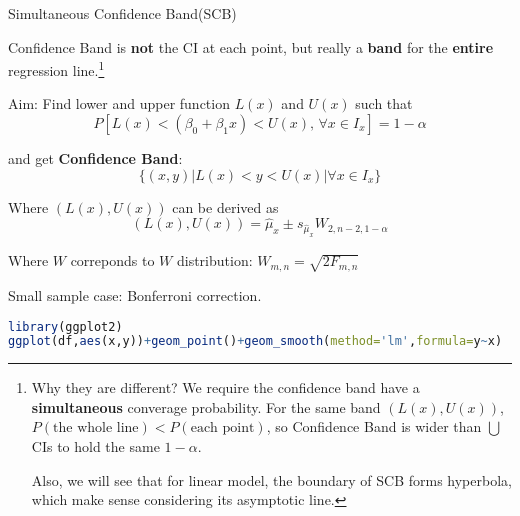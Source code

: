     


    \begin{point}
       Simultaneous Confidence Band(SCB)
    \end{point}

    Confidence Band is \textbf{not} the CI at each point, but really a \textbf{band} for the \textbf{entire} regression line.\footnote{Why they are different? We require the confidence band have a \textbf{simultaneous} converage probability. For the same band $ (L(x),U(x)) $, $ P(\text{the whole line})< P(\text{each point})$, so Confidence Band is wider than $ \bigcup $CIs to hold the same $ 1-\alpha $.
    
    Also, we will see that for linear model, the boundary of SCB forms hyperbola, which make sense considering its asymptotic line.}
    
    
    Aim: Find lower and upper function $ L(x) $ and $ U(x) $ such that
    \begin{equation}
        P[L(x)<(\beta _0+\beta _1x)<U(x),\,\forall x\in I_x]=1-\alpha  
    \end{equation}
    
    and get \textbf{Confidence Band}:
    \begin{equation}
        \{(x,y)|L(x)<y<U(x)|\forall x\in I_x\} 
    \end{equation}
    

    Where $ (L(x),U(x)) $ can be derived as
    \begin{equation}
        (L(x),U(x))=\hat{\mu}_x\pm s_{\hat{\mu}_x}W_{2,n-2,1-\alpha}
    \end{equation}

    Where $ W $ correponds to $ W $ distribution: $ W_{m,n}=\sqrt{2F_{m,n}} $
    
    
    
    Small sample case: Bonferroni correction.
    
\begin{rcode}
\begin{lstlisting}[language=R]
library(ggplot2)
ggplot(df,aes(x,y))+geom_point()+geom_smooth(method='lm',formula=y~x)
\end{lstlisting}
\end{rcode}


